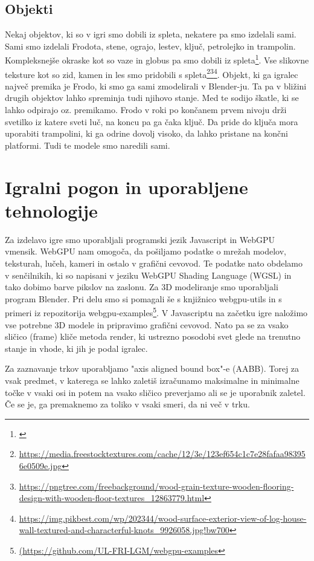 \documentclass[a4paper,12pt]{article}
\begin{document}
\subsection{Objekti}
\noindent Nekaj objektov, ki so v igri smo dobili iz spleta, nekatere pa smo izdelali sami. Sami smo izdelali Frodota, stene, ograjo, lestev, ključ, petrolejko in trampolin. Kompleksnejše okraske kot so vaze in globus pa smo dobili iz spleta\footnote{\url{}}. Vse slikovne teksture kot so zid, kamen in les smo pridobili s spleta\footnote{\url{https://media.freestocktextures.com/cache/12/3e/123ef654c1c7e28fafaa983956e0509e.jpg}}\footnote{\url{https://pngtree.com/freebackground/wood-grain-texture-wooden-flooring-design-with-wooden-floor-textures_12863779.html}}\footnote{\url{https://img.pikbest.com/wp/202344/wood-surface-exterior-view-of-log-house-wall-textured-and-characterful-knots_9926058.jpg!bw700}}. Objekt, ki ga igralec največ premika je Frodo, ki smo ga sami zmodelirali v Blender-ju. Ta pa v bližini drugih objektov lahko spreminja tudi njihovo stanje. Med te sodijo škatle, ki se lahko odpirajo oz. premikamo. Frodo v roki po končanem prvem nivoju drži svetilko iz katere sveti luč, na koncu pa ga čaka ključ. Da pride do ključa mora uporabiti trampolini, ki ga odrine dovolj visoko, da lahko pristane na končni platformi. Tudi te modele smo naredili sami.


\newpage

\section{Igralni pogon in uporabljene tehnologije}
\noindent Za izdelavo igre smo uporabljali programski jezik Javascript in WebGPU vmensik. WebGPU nam omogoča, da pošiljamo podatke o mrežah modelov, teksturah, lučeh, kameri in ostalo v grafični cevovod. Te podatke nato obdelamo v senčilnikih, ki so napisani v jeziku WebGPU Shading Language (WGSL) in tako dobimo barve pikslov na zaslonu. Za 3D modeliranje smo uporabljali program Blender. Pri delu smo si pomagali še s knjižnico webgpu-utils in s primeri iz repozitorija webgpu-examples\footnote{\url{(https://github.com/UL-FRI-LGM/webgpu-examples}}.
V Javascriptu na začetku igre naložimo vse potrebne 3D modele in pripravimo grafični cevovod. Nato pa se za vsako sličico (frame) kliče metoda render, ki ustrezno posodobi svet glede na trenutno stanje in vhode, ki jih je podal igralec.

Za zaznavanje trkov uporabljamo "axis aligned bound box"-e (AABB). Torej za vsak predmet, v katerega se lahko zaletiš izračunamo maksimalne in minimalne točke v vsaki osi in potem na vsako sličico preverjamo ali se je uporabnik zaletel. Če se je, ga premaknemo za toliko v vsaki smeri, da ni več v trku.
\end{document}
